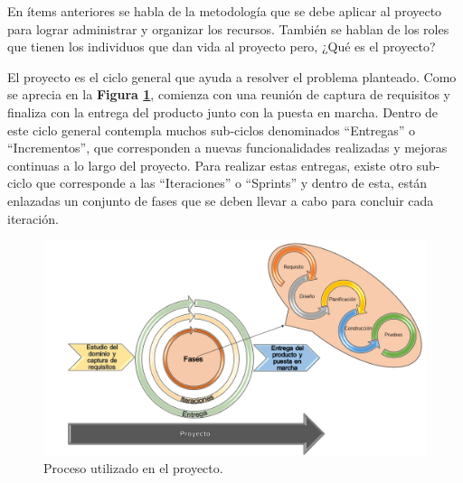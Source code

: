 En ítems anteriores se habla de la metodología que se debe aplicar al proyecto para lograr administrar y organizar los recursos. También se hablan de los roles que tienen los individuos que dan vida al proyecto pero, ¿Qué es el proyecto?

El proyecto es el ciclo general que ayuda a resolver el problema planteado. Como se aprecia en la \textbf{Figura \ref{fig: Proceso_Proyecto}}, comienza con una reunión de captura de requisitos y finaliza con la entrega del producto junto con la puesta en marcha. Dentro de este ciclo general contempla muchos sub-ciclos denominados ``Entregas'' o ``Incrementos'', que corresponden a nuevas funcionalidades realizadas y mejoras continuas a lo largo del proyecto. Para realizar estas entregas, existe otro sub-ciclo que corresponde a las ``Iteraciones'' o ``Sprints'' y dentro de esta, están enlazadas un conjunto de fases que se deben llevar a cabo para concluir cada iteración.

\begin{figure}[!htbp]
    \hspace{-9mm}
    \includegraphics[width=1.1\textwidth]{Imagenes/Proceso_Proyecto.png}
    \caption{\label{fig: Proceso_Proyecto}Proceso utilizado en el proyecto.}
\end{figure}